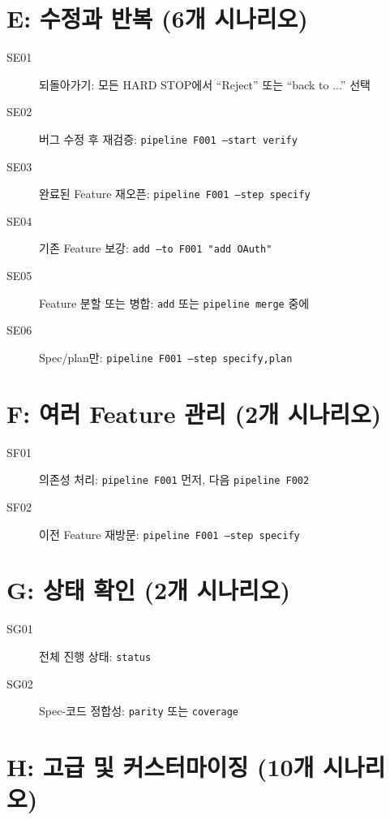\documentclass[11pt,a4paper,openright,twoside]{report}
\begin{document}
\section{E: 수정과 반복 (6개 시나리오)}

\begin{description}
  \item[SE01] 되돌아가기: 모든 HARD STOP에서 ``Reject'' 또는 ``back to ...'' 선택
  \item[SE02] 버그 수정 후 재검증: \texttt{pipeline F001 --start verify}
  \item[SE03] 완료된 Feature 재오픈: \texttt{pipeline F001 --step specify}
  \item[SE04] 기존 Feature 보강: \texttt{add --to F001 "add OAuth"}
  \item[SE05] Feature 분할 또는 병합: \texttt{add} 또는 \texttt{pipeline merge} 중에
  \item[SE06] Spec/plan만: \texttt{pipeline F001 --step specify,plan}
\end{description}

\section{F: 여러 Feature 관리 (2개 시나리오)}

\begin{description}
  \item[SF01] 의존성 처리: \texttt{pipeline F001} 먼저, 다음 \texttt{pipeline F002}
  \item[SF02] 이전 Feature 재방문: \texttt{pipeline F001 --step specify}
\end{description}

\section{G: 상태 확인 (2개 시나리오)}

\begin{description}
  \item[SG01] 전체 진행 상태: \texttt{status}
  \item[SG02] Spec-코드 정합성: \texttt{parity} 또는 \texttt{coverage}
\end{description}

\section{H: 고급 및 커스터마이징 (10개 시나리오)}
\end{document}
